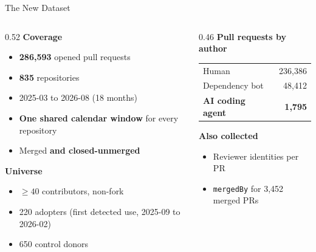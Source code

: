 \begin{frame}{The New Dataset}
\begin{columns}[T]
\begin{column}{0.52\textwidth}
\textbf{Coverage}
\begin{itemize}\small
  \item \textbf{286,593} opened pull requests
  \item \textbf{835} repositories
  \item 2025-03 to 2026-08 (18 months)
  \item \textbf{One shared calendar window} for every repository
  \item Merged \textbf{and closed-unmerged}
\end{itemize}
\vspace{0.4em}
\textbf{Universe}
\begin{itemize}\small
  \item $\geq 40$ contributors, non-fork
  \item 220 adopters (first detected use, 2025-09 to 2026-02)
  \item 650 control donors
\end{itemize}
\end{column}
\begin{column}{0.46\textwidth}
\textbf{Pull requests by author}
\begin{center}\small
\begin{tabular}{lr}
\toprule
Human & 236,386\\
Dependency bot & 48,412\\
\textbf{AI coding agent} & \textbf{1,795}\\
\bottomrule
\end{tabular}
\end{center}
\vspace{0.6em}
\textbf{Also collected}
\begin{itemize}\small
  \item Reviewer identities per PR
  \item \texttt{mergedBy} for 3,452 merged PRs
\end{itemize}
\end{column}
\end{columns}
\end{frame}

